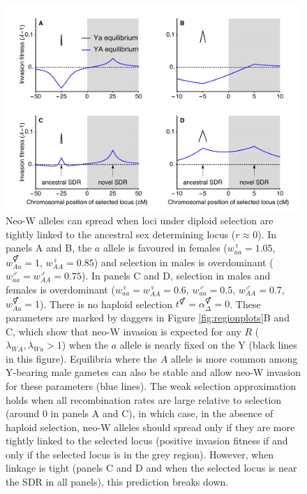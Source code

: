 \documentclass[12pt]{article}
\begin{document}
\begin{figure}[!h]
\centering
\centerline{\includegraphics[width=\linewidth]{PositionPlot_Overdominance_Mike}}
\caption{
Neo-W alleles can spread when loci under diploid selection are tightly linked to the ancestral sex determining locus ($r\approx0$). 
In panels A and B, the $a$ allele is favoured in females ($w_{aa}^\female=1.05$, $w_{Aa}^\Hermaphrodite=1$, $w_{AA}^\female=0.85$) and selection in males is overdominant ($w_{aa}^\male=w_{AA}^\male=0.75$).
In panels C and D, selection in males and females is overdominant ($w_{aa}^\female=w_{AA}^\female=0.6$, $w_{aa}^\male=0.5$, $w_{AA}^\male=0.7$, $w_{Aa}^\Hermaphrodite=1$).
There is no haploid selection $t^\Hermaphrodite = \alpha^\Hermaphrodite_\Delta = 0$.
These parameters are marked by daggers in Figure \ref{fig:regionplots}B and C, which show that neo-W invasion is expected for any $R$ ($\lambda_{WA},\lambda_{Wa}>1$) when the $a$ allele is nearly fixed on the Y (black lines in this figure). 
Equilibria where the $A$ allele is more common among Y-bearing male gametes can also be stable and allow neo-W invasion for these parameters (blue lines). 
The weak selection approximation holds when all recombination rates are large relative to selection (around 0 in panels A and C), in which case, in the absence of haploid selection, neo-W alleles should spread only if they are more tightly linked to the selected locus (positive invasion fitness if and only if the selected locus is in the grey region). 
However, when linkage is tight (panels C and D and when the selected locus is near the SDR in all panels), this prediction breaks down. 
}
\label{fig:positionOverdominance}
\end{figure}
\end{document}
